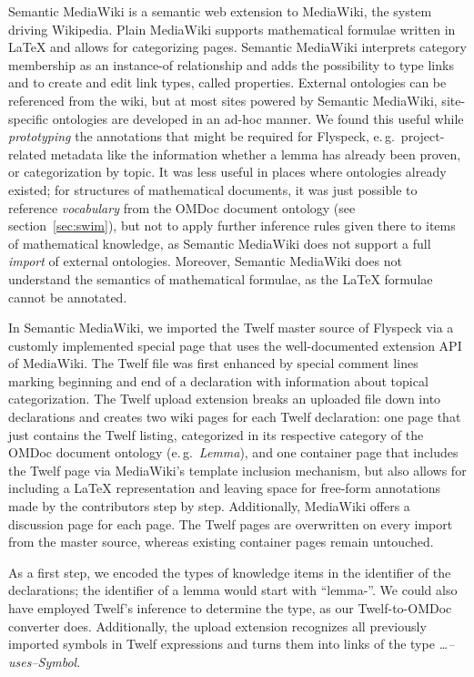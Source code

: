 Semantic MediaWiki\cite{KrSchVr:semwiki-reasoning07} is a semantic web extension
to MediaWiki, the system driving Wikipedia.  Plain MediaWiki supports
mathematical formulae written in {\LaTeX} and allows for categorizing pages.
Semantic MediaWiki interprets category membership as an instance-of relationship
and adds the possibility to type links and to create and edit link types, called
properties.  External ontologies can be referenced from the wiki, but at most
sites powered by Semantic MediaWiki, site-specific ontologies are developed in
an ad-hoc manner.  We found this useful while \emph{prototyping} the annotations
that might be required for Flyspeck, e.\,g.\ project-related metadata like the
information whether a lemma has already been proven, or categorization by topic.
It was less useful in places where ontologies already existed; for structures of
mathematical documents, it was just possible to reference \emph{vocabulary} from
the OMDoc document ontology (see section~\ref{sec:swim}), but not to apply
further inference rules given there to items of mathematical knowledge, as
Semantic MediaWiki does not support a full \emph{import} of external ontologies.
Moreover, Semantic MediaWiki does not understand the semantics of mathematical
formulae, as the {\LaTeX} formulae cannot be annotated.

In Semantic MediaWiki, we imported the Twelf master source of Flyspeck via a
customly implemented special page that uses the well-documented extension API of
MediaWiki.  The Twelf file was first enhanced by special comment lines marking
beginning and end of a declaration with information about topical categorization.
The Twelf upload extension breaks an uploaded file down into declarations and
creates two wiki pages for each Twelf declaration: one page that just contains
the Twelf listing, categorized in its respective category of the OMDoc document
ontology (e.\,g.\ \textit{Lemma}), and one container page that includes the
Twelf page via MediaWiki's template inclusion mechanism, but also allows for
including a {\LaTeX} representation and leaving space for free-form annotations
made by the contributors step by step.  Additionally, MediaWiki offers a
discussion page for each page.  The Twelf pages are overwritten on every import
from the master source, whereas existing container pages remain untouched.

As a first step, we encoded the types of knowledge items in the identifier of
the declarations; the identifier of a lemma would start with ``lemma-''.  We
could also have employed Twelf's inference to determine the
type, as our Twelf-to-OMDoc converter does.  Additionally, the upload
extension recognizes all previously imported symbols in Twelf expressions and
turns them into links of the type \textit{\ldots--uses--Symbol}.

